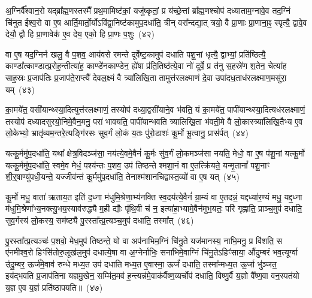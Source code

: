 अ॒ग्निर्वै᳚श्वान॒रो यद्ब्रा᳚ह्म॒णस्तस्मै᳚ प्रथ॒मामिष्ट॑कां॒ यजु॑ष्कृतां॒ प्र य॑च्छे॒त्तां ब्रा᳚ह्म॒णश्चोप॑ दध्याताम॒ग्नावे॒व तद॒ग्निं चि॑नुत ईश्व॒रो वा ए॒ष आर्ति॒मार्तो॒र्यो\-ऽवि॑द्वा॒निष्ट॑कामुप॒दधा॑ति॒ त्रीन् वरा᳚न्दद्या॒त् त्रयो॒ वै प्रा॒णाः प्रा॒णाना॒ꣴ॒ स्पृत्यै॒ द्वावे॒व देयौ॒ द्वौ हि प्रा॒णावेक॑ ए॒व देय॒ एको॒ हि प्रा॒णः प॒शुः~(४२)

वा ए॒ष यद॒ग्निर्न खलु॒ वै प॒शव॒ आय॑वसे रमन्ते दूर्वेष्ट॒कामुप॑ दधाति पशू॒नां धृत्यै॒ द्वाभ्यां॒ प्रति॑ष्ठित्यै॒ काण्डा᳚त्काण्डात्प्र॒रोह॒न्तीत्या॑ह॒ काण्डे॑नकाण्डेन॒ ह्ये॑षा प्र॑ति॒तिष्ठ॑त्ये॒वा नो॑ दूर्वे॒ प्र त॑नु स॒हस्रे॑ण श॒तेन॒ चेत्या॑ह साह॒स्रः प्र॒जा\-प॑तिः प्र॒जा\-प॑ते॒राप्त्यै॑ देवल॒क्ष्मं वै त्र्या॑लिखि॒ता तामुत्त॑रलक्ष्माणं दे॒वा उपा॑दध॒ताध॑रलक्ष्माण॒मसु॑रा॒ यम्~(४३)

का॒मये॑त॒ वसी॑यान्थ्स्या॒दित्युत्त॑रलक्ष्माणं॒ तस्योप॑ दध्या॒द्वसी॑याने॒व भ॑वति॒ यं का॒मये॑त॒ पापी॑यान्थ्स्या॒दित्यध॑र\-लक्ष्माणं॒ तस्योप॑ दध्यादसुरयो॒निमे॒वैन॒मनु॒ परा॑ भावयति॒ पापी॑यान्भवति त्र्यालिखि॒ता भ॑वती॒मे वै लो॒का\-स्त्र्या॑लिखि॒तैभ्य ए॒व लो॒केभ्यो॒ भ्रातृ॑व्यम॒न्तरे॒त्यङ्गि॑रसः सुव॒र्गं लो॒कं य॒तः पु॑रो॒डाशः॑ कू॒र्मो भू॒त्वानु॒ प्रास॑र्पत्~(४४)

यत्कू॒र्ममु॑प॒दधा॑ति॒ यथा᳚ क्षेत्र॒विदञ्ज॑सा॒ नय॑त्ये॒वमे॒वैनं॑ कू॒र्मः सु॑व॒र्गं लो॒कमञ्ज॑सा नयति॒ मेधो॒ वा ए॒ष प॑शू॒नां यत्कू॒र्मो यत्कू॒र्ममु॑प॒दधा॑ति॒ स्वमे॒व मेधं॒ पश्य॑न्तः प॒शव॒ उप॑ तिष्ठन्ते श्मशा॒नं वा ए॒तत्क्रि॑यते॒ यन्मृ॒तानां᳚ पशू॒नाꣳ शी॒र्॒\mbox{}षाण्यु॑पधी॒यन्ते॒ यज्जीव॑न्तं कू॒र्ममु॑प॒दधा॑ति॒ तेनाश्म॑शानचिद्वास्त॒व्यो॑ वा ए॒ष यत्~(४५)

कू॒र्मो मधु॒ वाता॑ ऋताय॒त इति॑ द॒ध्ना म॑धुमि॒श्रेणा॒भ्य॑नक्ति स्व॒दय॑त्ये॒वैनं॑ ग्रा॒म्यं वा ए॒तदन्नं॒ यद्दध्या॑र॒ण्यं मधु॒ यद्द॒ध्ना म॑धुमि॒श्रेणा᳚भ्य॒नक्त्यु॒भय॒स्याव॑रुद्ध्यै म॒ही द्यौः पृ॑थि॒वी च॑ न॒ इत्या॑हा॒भ्यामे॒वैन॑मुभ॒यतः॒ परि॑ गृह्णाति॒ प्राञ्च॒मुप॑ दधाति॒ सुव॒र्गस्य॑ लो॒कस्य॒ सम॑ष्ट्यै पु॒रस्ता᳚त्प्र॒त्यञ्च॒मुप॑ दधाति॒ तस्मा᳚त्~(४६)

पु॒रस्ता᳚त्प्र॒त्यञ्चः॑ प॒शवो॒ मेध॒मुप॑ तिष्ठन्ते॒ यो वा अप॑नाभिम॒ग्निं चि॑नु॒ते यज॑मानस्य॒ नाभि॒मनु॒ प्र वि॑शति॒ स ए॑नमीश्व॒रो हिꣳसि॑तोरु॒लूख॑ल॒मुप॑ दधात्ये॒षा वा अ॒ग्नेर्नाभिः॒ सना॑भिमे॒वाग्निं चि॑नु॒ते\-ऽहिꣳ॑साया॒ औ॑दुम्बरं भव॒त्यूर्ग्वा उ॑दु॒म्बर॒ ऊर्ज॑मे॒वाव॑ रुन्धे मध्य॒त उप॑ दधाति मध्य॒त ए॒वास्मा॒ ऊर्जं॑ दधाति॒ तस्मा᳚न्मध्य॒त ऊ॒र्जा भु॑ञ्जत॒ इय॑द्भवति प्र॒जा\-प॑तिना यज्ञमु॒खेन॒ सम्मि॑त॒मव॑ ह॒न्त्यन्न॑मे॒वाक॑र्वैष्ण॒व्यर्चोप॑ दधाति॒ विष्णु॒र्वै य॒ज्ञो वै᳚ष्ण॒वा वन॒स्पत॑यो य॒ज्ञ ए॒व य॒ज्ञं प्रति॑\-ष्ठापयति॥~(४७)

